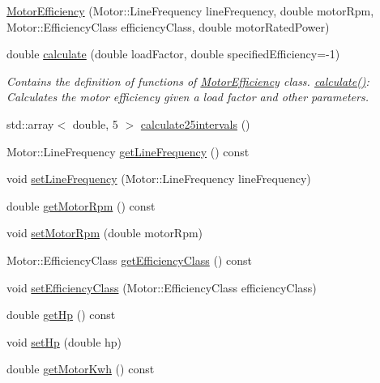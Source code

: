 \begin{DoxyCompactItemize}
\item 
\hyperlink{class_motor_efficiency_a04625cbf2e8e6fea0fb1d005bd36808c}{Motor\+Efficiency} (Motor\+::\+Line\+Frequency line\+Frequency, double motor\+Rpm, Motor\+::\+Efficiency\+Class efficiency\+Class, double motor\+Rated\+Power)
\item 
double \hyperlink{class_motor_efficiency_ace29950c3155ea4befd7961e28376e23}{calculate} (double load\+Factor, double specified\+Efficiency=-\/1)
\begin{DoxyCompactList}\small\item\em Contains the definition of functions of \hyperlink{class_motor_efficiency}{Motor\+Efficiency} class. \hyperlink{class_motor_efficiency_ace29950c3155ea4befd7961e28376e23}{calculate()}\+: Calculates the motor efficiency given a load factor and other parameters. \end{DoxyCompactList}\item 
std\+::array$<$ double, 5 $>$ \hyperlink{class_motor_efficiency_a4135d26efe506365d9ecb7c15f43f35d}{calculate25intervals} ()
\item 
Motor\+::\+Line\+Frequency \hyperlink{class_motor_efficiency_a3cc0ed606154a04d035399e05d1cb02a}{get\+Line\+Frequency} () const
\item 
void \hyperlink{class_motor_efficiency_a993b09941d330d3a46e0d72bd6dc65bb}{set\+Line\+Frequency} (Motor\+::\+Line\+Frequency line\+Frequency)
\item 
double \hyperlink{class_motor_efficiency_ab29655f487e90a73246be6e9bc67c36a}{get\+Motor\+Rpm} () const
\item 
void \hyperlink{class_motor_efficiency_a2c4ddf9f2f3e44c098dad91a0ddbaf21}{set\+Motor\+Rpm} (double motor\+Rpm)
\item 
Motor\+::\+Efficiency\+Class \hyperlink{class_motor_efficiency_a9eb7d5c2fc598f655c1a3d12790e4d17}{get\+Efficiency\+Class} () const
\item 
void \hyperlink{class_motor_efficiency_a1ff4790d01bf2e65bd7bce2edc98d0c5}{set\+Efficiency\+Class} (Motor\+::\+Efficiency\+Class efficiency\+Class)
\item 
double \hyperlink{class_motor_efficiency_a9f88159c82daa270975d7969debe88a9}{get\+Hp} () const
\item 
void \hyperlink{class_motor_efficiency_a4b86113447665413ddbae115199d9b3f}{set\+Hp} (double hp)
\item 
double \hyperlink{class_motor_efficiency_a4d21d0c44ee00f5d097b0acbcb73a8d8}{get\+Motor\+Kwh} () const

\end{DoxyCompactItemize}
